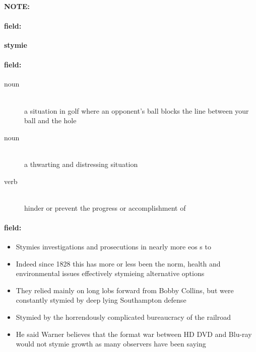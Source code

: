 \documentclass[12pt]{article}
\newenvironment{note}{\paragraph{NOTE:}}{}
\newenvironment{field}{\paragraph{field:}}{}
\begin{document}
\begin{note}
\begin{field}
\textbf{\large stymie}
\end{field}


\begin{field}
\begin{description}
\item[noun] \hfill \\ 
a situation in golf where an opponent's ball blocks the line between your ball and the hole

\item[noun] \hfill \\ 
a thwarting and distressing situation

\item[verb] \hfill \\ 
hinder or prevent the progress or accomplishment of

\end{description}
\end{field}

\begin{field}
\begin{itemize}
\item Stymies investigations and prosecutions in nearly more eos s to
\item Indeed since 1828 this has more or less been the norm, health and environmental issues effectively stymieing alternative options
\item They relied mainly on long lobs forward from Bobby Collins, but were constantly stymied by deep lying Southampton defense
\item Stymied by the horrendously complicated bureaucracy of the railroad
\item He said Warner believes that the format war between HD DVD and Blu-ray would not stymie growth as many observers have been saying
\end{itemize}
\end{field}
\end{note}
\end{document}
